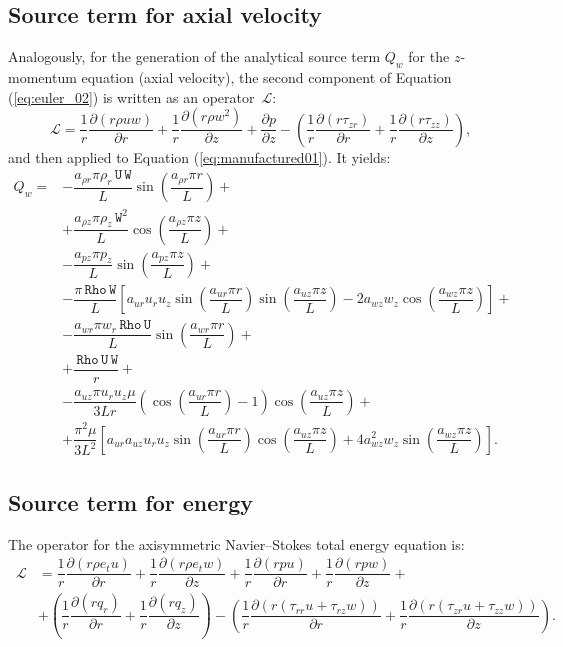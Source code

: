 \documentclass[10pt]{article}
\newcommand{\Diff}[2] {\dfrac{\partial( #1)}{\partial #2}}
\newcommand{\diff}[2] {\dfrac{\partial #1}{\partial #2}}
\newcommand{\Lo}{\,\mathcal{L}}
\newcommand{\Rho}{\,\mathtt{Rho}}
\newcommand{\U}{\,\mathtt{U}}
\newcommand{\W}{\,\mathtt{W}}
\begin{document}
\subsection{Source term for axial velocity}
Analogously, for the generation of the analytical source term $Q_w$ for the $z$-momentum equation (axial velocity), the second component of Equation  (\ref{eq:euler_02})  is written as an  operator $\Lo$:
\begin{equation*}
   \Lo = \dfrac{1}{r}\Diff{r \rho  u w}{r}+ \dfrac{1}{r}\Diff{r \rho w^2 }{z}+\diff{p}{z}- \left(\dfrac{1}{r}\Diff{r \tau_{zr}}{r}+\dfrac{1}{r}\Diff{r \tau_{zz}}{z}\right) ,
\end{equation*}
and then applied to Equation  (\ref{eq:manufactured01}). It yields:
\begin{equation}
 \begin{split}
 \displaystyle
Q_w  =
&-\dfrac{a_{\rho r} \pi \rho_r \U \W }{L}\sin\left(\dfrac{a_{\rho r} \pi r}{L}\right)+ \\
&+\dfrac{a_{\rho z} \pi \rho_z \W^2 }{L}\cos\left(\dfrac{a_{\rho z} \pi z}{L}\right)+ \\
&-\dfrac{a_{pz} \pi p_z }{L}\sin\left(\dfrac{a_{pz} \pi z}{L}\right)+ \\
&-\dfrac{\pi \Rho \W}{L}\left[a_{ur} u_r u_z \sin\left(\dfrac{a_{ur} \pi r}{L}\right) \sin\left(\dfrac{a_{uz} \pi z}{L}\right)-2 a_{wz} w_z \cos\left(\dfrac{a_{wz} \pi z}{L}\right)\right] + \\
&-\dfrac{a_{wr} \pi w_r \Rho \U }{L}\sin\left(\dfrac{a_{wr} \pi r}{L}\right)+ \\
&+\dfrac{\Rho \U \W}{r} +\\
&-\dfrac{a_{uz} \pi u_r u_z \mu}{3Lr}\left( \cos\left(\dfrac{a_{ur} \pi r}{L}\right) -1 \right)  \cos\left(\dfrac{a_{uz} \pi z}{L}\right)+ \\
&+\dfrac{\pi^2 \mu}{3L^2} \left[a_{ur} a_{uz} u_r u_z \sin\left(\dfrac{a_{ur} \pi r}{L}\right) \cos\left(\dfrac{a_{uz} \pi z}{L}\right)+4 a_{wz}^2 w_z \sin\left(\dfrac{a_{wz} \pi z}{L}\right)\right] .
\end{split}
\end{equation}



\subsection{Source term for energy}

The operator for the axisymmetric Navier--Stokes total energy equation is:
\begin{equation*}
\begin{split}
 \Lo&= \dfrac{1}{r}\Diff{r \rho e_t u}{ r}+\dfrac{1}{r}\Diff{r \rho e_t w}{z} +\dfrac{1}{r}\Diff{r p  u}{ r}+\dfrac{1}{r}\Diff{r p w}{z}+\\
&+\left(\dfrac{1}{r}\Diff{r q_r }{r} + \dfrac{1}{r}\Diff{r q_z }{z}\right) -\left(\dfrac{1}{r}\Diff{r( \tau_{rr} u + \tau_{rz} w ) }{r} + \dfrac{1}{r}\Diff{ r(\tau_{zr} u + \tau_{zz} w ) }{z}\right) .
\end{split}
\end{equation*}
\end{document}
